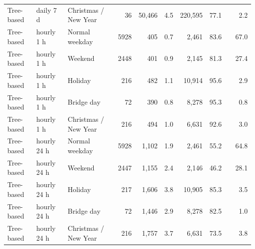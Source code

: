 \begin{tabular}{lllrrrrrrr}
Tree-based & daily 7 d & Christmas / New Year & 36 & 50,466 & 4.5 & 220,595 & 77.1 &  & 2.2 \\
Tree-based & hourly 1 h & Normal weekday & 5928 & 405 & 0.7 & 2,461 & 83.6 &  & 67.0 \\
Tree-based & hourly 1 h & Weekend & 2448 & 401 & 0.9 & 2,145 & 81.3 &  & 27.4 \\
Tree-based & hourly 1 h & Holiday & 216 & 482 & 1.1 & 10,914 & 95.6 &  & 2.9 \\
Tree-based & hourly 1 h & Bridge day & 72 & 390 & 0.8 & 8,278 & 95.3 &  & 0.8 \\
Tree-based & hourly 1 h & Christmas / New Year & 216 & 494 & 1.0 & 6,631 & 92.6 &  & 3.0 \\
Tree-based & hourly 24 h & Normal weekday & 5928 & 1,102 & 1.9 & 2,461 & 55.2 &  & 64.8 \\
Tree-based & hourly 24 h & Weekend & 2447 & 1,155 & 2.4 & 2,146 & 46.2 &  & 28.1 \\
Tree-based & hourly 24 h & Holiday & 217 & 1,606 & 3.8 & 10,905 & 85.3 &  & 3.5 \\
Tree-based & hourly 24 h & Bridge day & 72 & 1,446 & 2.9 & 8,278 & 82.5 &  & 1.0 \\
Tree-based & hourly 24 h & Christmas / New Year & 216 & 1,757 & 3.7 & 6,631 & 73.5 &  & 3.8 \\
\bottomrule
\end{tabular}

